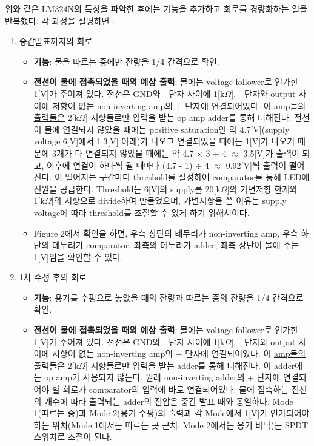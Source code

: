 \documentclass[a4paper,itemph]{oblivoir}
\theoremstyle{definition}
\begin{document}
위와 같은 LM324N의 특성을 파악한 후에는 기능을 추가하고 회로를 경량화하는 일을 반복했다. 각 과정을 설명하면 :
\begin{enumerate}
    \item 중간발표까지의 회로
    \begin{itemize}
        \item \textbf{기능}: 물을 따르는 중에만 잔량을 1/4 간격으로 확인.
        \item \textbf{전선이 물에 접촉되었을 때의 예상 출력}: \underline{물에는} voltage follower로 인가한 1[V]가 주어져 있다. \underline{전선은} GND와 - 단자 사이에 1[k$\Omega$], - 단자와 output 사이에 저항이 없는 non-inverting amp의 + 단자에 연결되어있다. 이 \underline{amp들의 출력들은} 2[k$\Omega$] 저항들로만 입력을 받는 op amp adder를 통해 더해진다. 전선이 물에 연결되지 않았을 때에는 positive saturation인 약 4.7[V](supply voltage 6[V]에서 1.3[V] 아래)가 나오고 연결되었을 때에는 1[V]가 나오기 때문에 3개가 다 연결되지 않았을 때에는 약 4.7 $\times$ 3 $\div$ 4 $\approx$ 3.5[V]가 출력이 되고, 이후에 연결이 하나씩 될 때마다 (4.7 - 1) $\div$ 4 $\approx$ 0.92[V]씩 출력이 떨어진다. 이 떨어지는 구간마다 threshold를 설정하여 comparator를 통해 LED에 전원을 공급한다. Threshold는 6[V]의 supply를 20[k$\Omega$]의 가변저항 한개와 1[k$\Omega$]의 저항으로 divide하여 만들었으며, 가변저항을 쓴 이유는 supply voltage에 따라 threshold를 조절할 수 있게 하기 위해서이다.
        \item Figure 2에서 확인을 하면, 우측 상단의 테두리가 non-inverting amp, 우측 하단의 테두리가 comparator, 좌측의 테두리가 adder, 좌측 상단이 물에 주는 1[V]임을 확인할 수 있다.
    \end{itemize}
    \item 1차 수정 후의 회로
    \begin{itemize}
        \item \textbf{기능}: 용기를 수평으로 놓았을 때의 잔량과 따르는 중의 잔량을 1/4 간격으로 확인.
        \item \textbf{전선이 물에 접촉되었을 때의 예상 출력}: \underline{물에는} voltage follower로 인가한 1[V]가 주어져 있다. \underline{전선은} GND와 - 단자 사이에 1[k$\Omega$], - 단자와 output 사이에 저항이 없는 non-inverting amp의 + 단자에 연결되어있다. 이 \underline{amp들의 출력들은} 2[k$\Omega$] 저항들로만 입력을 받는 adder를 통해 더해진다. 이 adder에는 op amp가 사용되지 않는다. 원래 non-inverting adder의 + 단자에 연결되어야 할 회로가 comparator의 입력에 바로 연결되어있다. 물에 접촉하는 전선의 개수에 따라 출력되는 adder의 전압은 중간 발표 때와 동일하다. Mode 1(따르는 중)과 Mode 2(용기 수평)의 출력과 각 Mode에서 1[V]가 인가되어야 하는 위치(Mode 1에서는 따르는 곳 근처, Mode 2에서는 용기 바닥)는 SPDT 스위치로 조절이 된다.

\end{itemize}
\end{enumerate}
\end{document}
